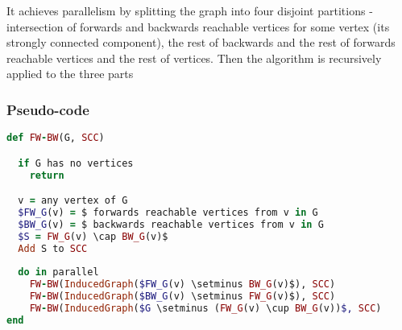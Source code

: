 \documentclass{report}
\theoremstyle{plain}
\theoremstyle{definition}
\theoremstyle{remark}
\numberwithin{definition}{chapter}
\numberwithin{example}{chapter}
\numberwithin{figure}{chapter}
\numberwithin{theorem}{chapter}
\numberwithin{lemma}{chapter}
\begin{document}
It achieves parallelism by splitting the graph into four disjoint partitions - intersection of forwards and backwards reachable vertices for some vertex (its strongly connected component), the rest of backwards and the rest of forwards reachable vertices and the rest of vertices. Then the algorithm is recursively applied to the three parts

\subsubsection*{Pseudo-code}

\begin{lstlisting}[language=Ruby, mathescape]
def FW-BW(G, SCC)

  if G has no vertices
    return

  v = any vertex of G
  $FW_G(v) = $ forwards reachable vertices from v in G
  $BW_G(v) = $ backwards reachable vertices from v in G
  $S = FW_G(v) \cap BW_G(v)$
  Add S to SCC
  
  do in parallel
    FW-BW(InducedGraph($FW_G(v) \setminus BW_G(v)$), SCC)
    FW-BW(InducedGraph($BW_G(v) \setminus FW_G(v)$), SCC)
    FW-BW(InducedGraph($G \setminus (FW_G(v) \cup BW_G(v))$, SCC)
end
\end{lstlisting}
\end{document}

